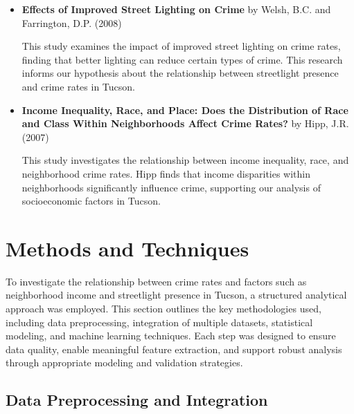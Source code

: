 \documentclass{report}
\begin{document}
\begin{itemize}
\item \textbf{Effects of Improved Street Lighting on Crime} by Welsh, B.C. and Farrington, D.P. (2008) \cite{welsh08}
  \par This study examines the impact of improved street lighting on crime rates, finding that better lighting can reduce certain types of crime. This research informs our hypothesis about the relationship between streetlight presence and crime rates in Tucson.
  
\item \textbf{Income Inequality, Race, and Place: Does the Distribution of Race and Class Within Neighborhoods Affect Crime Rates?} by Hipp, J.R. (2007) \cite{jr07}
  \par This study investigates the relationship between income inequality, race, and neighborhood crime rates. Hipp finds that income disparities within neighborhoods significantly influence crime, supporting our analysis of socioeconomic factors in Tucson.
\end{itemize}

\newpage
\section{Methods and Techniques}

\par To investigate the relationship between crime rates and factors such as neighborhood income and streetlight presence in Tucson, a structured analytical approach was employed. This section outlines the key methodologies used, including data preprocessing, integration of multiple datasets, statistical modeling, and machine learning techniques. Each step was designed to ensure data quality, enable meaningful feature extraction, and support robust analysis through appropriate modeling and validation strategies.

\subsection{Data Preprocessing and Integration}
\end{document}
